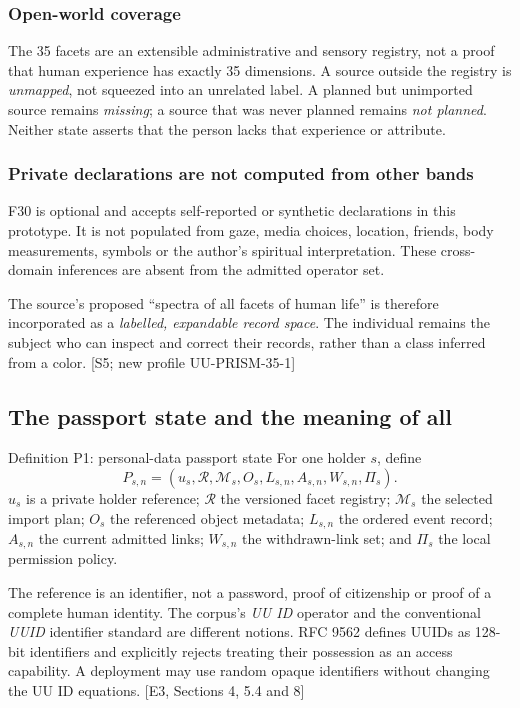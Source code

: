 \documentclass[11pt,a4paper]{article}
\newcommand{\newpagehead}[1]{\clearpage\subsection{#1}}
\newcommand{\source}[1]{{\sffamily\small\color{slate}[#1]}}
\begin{document}
\subsubsection{Open-world coverage}
The 35 facets are an extensible administrative and sensory registry, not a proof that human experience has exactly 35 dimensions. A source outside the registry is \emph{unmapped}, not squeezed into an unrelated label. A planned but unimported source remains \emph{missing}; a source that was never planned remains \emph{not planned}. Neither state asserts that the person lacks that experience or attribute.

\subsubsection{Private declarations are not computed from other bands}
F30 is optional and accepts self-reported or synthetic declarations in this prototype. It is not populated from gaze, media choices, location, friends, body measurements, symbols or the author's spiritual interpretation. These cross-domain inferences are absent from the admitted operator set.

The source's proposed ``spectra of all facets of human life'' is therefore incorporated as a \emph{labelled, expandable record space}. The individual remains the subject who can inspect and correct their records, rather than a class inferred from a color. \source{S5; new profile UU-PRISM-35-1}

\newpagehead{The passport state and the meaning of all}
\begin{formal}{Definition P1: personal-data passport state}
For one holder $s$, define
\[
 P_{s,n}=(u_s,\mathcal R,\mathcal M_s,O_s,L_{s,n},A_{s,n},W_{s,n},\Pi_s).
\]
$u_s$ is a private holder reference; $\mathcal R$ the versioned facet registry; $\mathcal M_s$ the selected import plan; $O_s$ the referenced object metadata; $L_{s,n}$ the ordered event record; $A_{s,n}$ the current admitted links; $W_{s,n}$ the withdrawn-link set; and $\Pi_s$ the local permission policy.
\end{formal}

The reference is an identifier, not a password, proof of citizenship or proof of a complete human identity. The corpus's \emph{UU ID} operator and the conventional \emph{UUID} identifier standard are different notions. RFC 9562 defines UUIDs as 128-bit identifiers and explicitly rejects treating their possession as an access capability. A deployment may use random opaque identifiers without changing the UU ID equations. \source{E3, Sections 4, 5.4 and 8}
\end{document}
